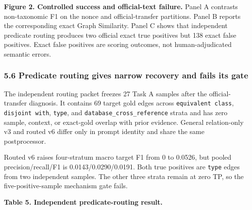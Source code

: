 \documentclass[
]{article}
\begin{document}
\textbf{Figure 2. Controlled success and official-text failure.} Panel A
contrasts non-taxonomic F1 on the nonce and official-transfer
partitions. Panel B reports the corresponding exact Graph Similarity.
Panel C shows that independent predicate routing produces two official
exact true positives but 138 exact false positives. Exact false
positives are scoring outcomes, not human-adjudicated semantic errors.

\subsubsection{5.6 Predicate routing gives narrow recovery and fails its
gate}\label{predicate-routing-gives-narrow-recovery-and-fails-its-gate}

The independent routing packet freezes 27 Task A samples after the
official-transfer diagnosis. It contains 69 target gold edges across
\texttt{equivalent\ class}, \texttt{disjoint\ with}, \texttt{type}, and
\texttt{database\_cross\_reference} strata and has zero sample, context,
or exact-gold overlap with prior evidence. General relation-only v3 and
routed v6 differ only in prompt identity and share the same
postprocessor.

Routed v6 raises four-stratum macro target F1 from 0 to 0.0526, but
pooled precision/recall/F1 is 0.0143/0.0290/0.0191. Both true positives
are \texttt{type} edges from two independent samples. The other three
strata remain at zero TP, so the five-positive-sample mechanism gate
fails.

\textbf{Table 5. Independent predicate-routing result.}
\end{document}
